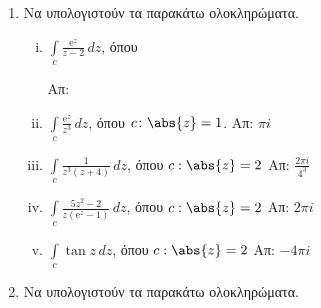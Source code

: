 \documentclass[a4paper,table]{report}
\begin{document}
\begin{center}
  \minibox{\large\bfseries \textcolor{Col1}{Ασκήσεις Ολοκληρώματα}}
\end{center}

\vspace{\baselineskip} 

\begin{enumerate}

  \item Να υπολογιστούν τα παρακάτω ολοκληρώματα.

    \begin{enumerate}[i)]
      \item $ \int \limits_c\frac{\mathrm{e}^{z}}{z-2} \,{dz} $, \quad όπου 
        \hfill Απ: 
      \item $ \int \limits_c \frac{\mathrm{e}^{z}}{z^3} \,{dz} $, \quad όπου $ c\colon
        \abs{z} = 1 $.
        \hfill Απ: $ \pi i $  
      \item $ \int \limits_{c}\frac{1}{z^{3}(z+4)} \,{dz} $, \quad όπου $c:\abs{z}=2 $ 
        \hfill Απ: $ \frac{2 \pi i}{4^{3}} $  
      \item $\int\limits_c\frac{5z^2-2}{z(\mathrm{e}^{z}-1)}\,dz$, \quad όπου $c:\abs{z}=2$ 
        \hfill Απ: $2\pi i$
      \item $\int\limits_c\tan z\,dz$, \quad όπου $c:\abs{z}=2$ \hfill Απ: $-4\pi i$
    \end{enumerate}

  \item Να υπολογιστούν τα παρακάτω ολοκληρώματα.


\end{enumerate}
\end{document}
